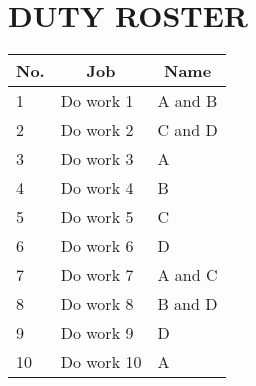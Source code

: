 \section*{DUTY ROSTER}
 {}

\begin{table}[!ht]
\begin{tabular}{|l|l|l|}
\hline
\multicolumn{1}{|c|}{\textbf{No.}} & \multicolumn{1}{c|}{\textbf{Job}}                  & \multicolumn{1}{c|}{\textbf{Name}} \\ \hline
1 & Do work 1  & A and B  \\ \hline
2 & Do work 2  & C and D  \\ \hline
3 & Do work 3  & A  \\ \hline
4 & Do work 4 & B  \\ \hline
5 & Do work 5  & C \\ \hline
6 & Do work 6  & D  \\ \hline
7 & Do work 7 & A and C \\ \hline
8 & Do work 8   & B and D  \\ \hline
9 & Do work 9  & D \\ \hline
10 & Do work 10  & A\\ \hline
\end{tabular}
\end{table}

\newpage